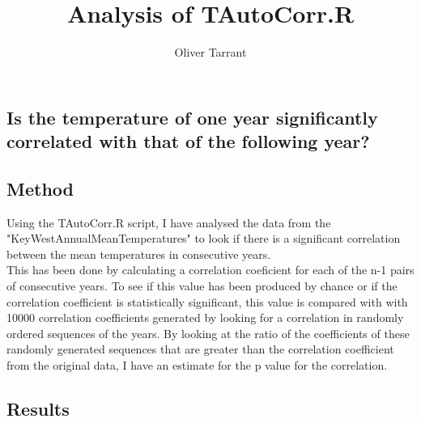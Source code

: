 \documentclass[10pt]{article}\usepackage[]{graphicx}\usepackage[]{color}
\begin{document}
\topmargin=-0.5in
\headheight=0pt
\textheight=10.5in
\title{Analysis of TAutoCorr.R}
\author{Oliver Tarrant}
\date{}

\maketitle

\begin{center}
\section*{Is the temperature of one year significantly correlated with that of the following year?}
\end{center}
\subsection*{Method} 
Using the TAutoCorr.R script, I have analysed the data from the "KeyWestAnnualMeanTemperatures" to look if there is a significant correlation between the mean temperatures in consecutive years. \\
This has been done by calculating a correlation coeficient for each of the  n-1 pairs of consecutive years. To see if this value has been produced by chance or if the correlation coefficient is statistically significant, this value is compared with with 10000 correlation coefficients generated by looking for a correlation in randomly ordered sequences of the years. By looking at the ratio of the coefficients of these randomly generated sequences that are greater than the correlation coefficient from the original data, I have an estimate for the p value for the correlation. 

\subsection*{Results}
\smallskip
\end{document}
